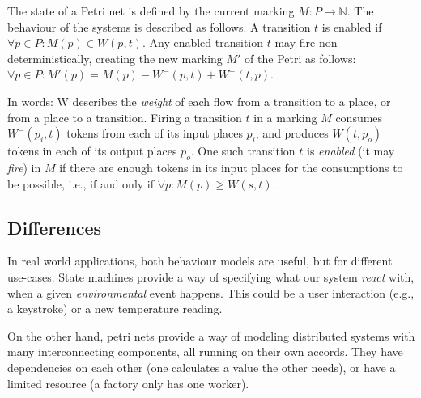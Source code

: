 The state of a Petri net is defined by the current marking \( M : P \rightarrow \mathbb{N} \). The behaviour of the systems is described as follows. A transition \( t \) is enabled if \( \forall p \in P : M(p) \in W(p, t) \). Any enabled transition \(t\) may fire non-deterministically, creating the new marking \( M' \) of the Petri as follows: \( \forall p \in P : M'(p) = M(p) - W^-(p, t) + W^+(t, p) \).

In words: W describes the \emph{weight} of each flow from a transition to a place, or from a place to a transition. Firing a transition \(t\) in a marking \(M\) consumes \(W^-(p_i, t)\) tokens from each of its input places \(p_i\), and produces \(W(t, p_o)\) tokens in each of its output places \(p_o\). One such transition \(t\) is \emph{enabled} (it may \emph{fire}) in \(M\) if there are enough tokens in its input places for the consumptions to be possible, i.e., if and only if \( \forall p : M(p) \ge W(s, t)\).

\subsection{Differences}

In real world applications, both behaviour models are useful, but for different use-cases. State machines provide a way of specifying what our system \emph{react} with, when a given \emph{environmental} event happens. This could be a user interaction (e.g., a keystroke) or a new temperature reading.

On the other hand, petri nets provide a way of modeling distributed systems with many interconnecting components, all running on their own accords. They have dependencies on each other (one calculates a value the other needs), or have a limited resource (a factory only has one worker).
